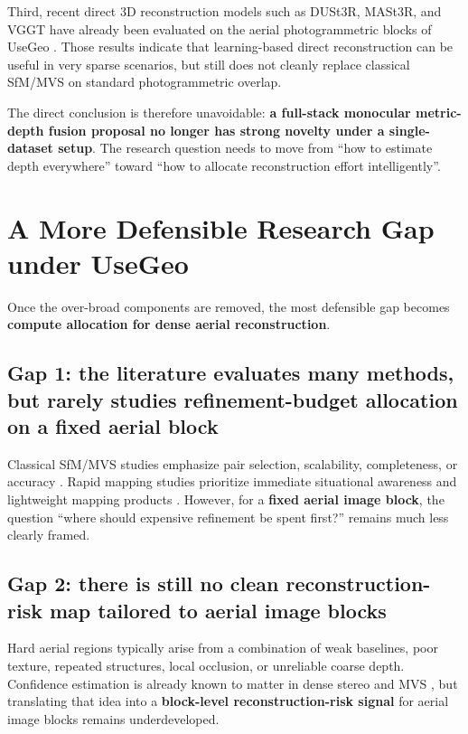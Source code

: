 \documentclass[11pt,a4paper]{article}
\begin{document}
Third, recent direct 3D reconstruction models such as DUSt3R, MASt3R, and VGGT have already been evaluated on the aerial photogrammetric blocks of UseGeo \citep{Wu2025AerialBlocks}. Those results indicate that learning-based direct reconstruction can be useful in very sparse scenarios, but still does not cleanly replace classical SfM/MVS on standard photogrammetric overlap.

The direct conclusion is therefore unavoidable: \textbf{a full-stack monocular metric-depth fusion proposal no longer has strong novelty under a single-dataset setup}. The research question needs to move from ``how to estimate depth everywhere'' toward ``how to allocate reconstruction effort intelligently''.

\section{A More Defensible Research Gap under UseGeo}

Once the over-broad components are removed, the most defensible gap becomes \textbf{compute allocation for dense aerial reconstruction}.

\subsection{Gap 1: the literature evaluates many methods, but rarely studies refinement-budget allocation on a fixed aerial block}

Classical SfM/MVS studies emphasize pair selection, scalability, completeness, or accuracy \citep{Jiang2022Leveraging,Jiang2022Parallel,Liu2023Deep,Liao2024High,Jiang2024Efficient}. Rapid mapping studies prioritize immediate situational awareness and lightweight mapping products \citep{Campos2021ORB,Qin2018VINS,Liu2025ARTEMIS}. However, for a \textbf{fixed aerial image block}, the question ``where should expensive refinement be spent first?'' remains much less clearly framed.

\subsection{Gap 2: there is still no clean reconstruction-risk map tailored to aerial image blocks}

Hard aerial regions typically arise from a combination of weak baselines, poor texture, repeated structures, local occlusion, or unreliable coarse depth. Confidence estimation is already known to matter in dense stereo and MVS \citep{Li2020Confidence}, but translating that idea into a \textbf{block-level reconstruction-risk signal} for aerial image blocks remains underdeveloped.
\end{document}
